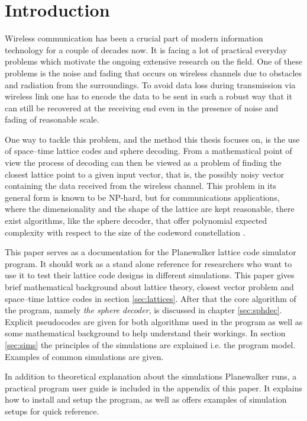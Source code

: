 \documentclass[english,12pt,a4paper,pdftex,sci,utf8]{aaltothesis}
\begin{document}
\section{Introduction}
Wireless communication has been a crucial part of modern information technology for a couple of decades now. It is facing a lot of practical everyday problems which motivate the ongoing extensive research on the field. One of these problems is the noise and fading that occurs on wireless channels due to obstacles and radiation from the surroundings. To avoid data loss during transmission via wireless link one has to encode the data to be sent in such a robust way that it can still be recovered at the receiving end even in the presence of noise and fading of reasonable scale. 
\par One way to tackle this problem, and the method this thesis focuses on, is the use of space--time lattice codes and sphere decoding. From a mathematical point of view the process of decoding can then be viewed as a problem of finding the closest lattice point to a given input vector, that is, the possibly noisy vector containing the data received from the wireless channel. This problem in its general form is known to be NP-hard, but for communications applications, where the dimensionality and the shape of the lattice are kept reasonable, there exist algorithms, like the sphere decoder, that offer polynomial expected complexity with respect to the size of the codeword constellation \cite{mia}.
\par This paper serves as a documentation for the Planewalker lattice code simulator program. It should work as a stand alone reference for researchers who want to use it to test their lattice code designs in different simulations. This paper gives brief mathematical background about lattice theory, closest vector problem and space--time lattice codes in section \ref{sec:lattices}. After that the core algorithm of the program, namely \emph{the sphere decoder}, is discussed in chapter \ref{sec:sphdec}. Explicit pseudocodes are given for both algorithms used in the program as well as some mathematical background to help understand their workings. In section \ref{sec:sims} the principles of the simulations are explained i.e. the program model. Examples of common simulations are given.
\par In addition to theoretical explanation about the simulations Planewalker runs, a practical program user guide is included in the appendix of this paper. It explains how to install and setup the program, as well as offers examples of simulation setups for quick reference.
\end{document}
